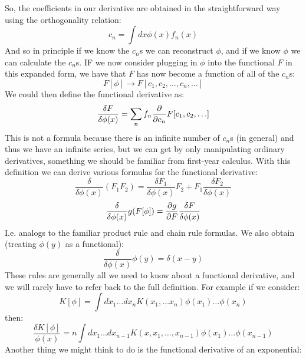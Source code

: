So, the coefficients in our derivative are obtained in the straightforward way using the orthogonality relation:
\begin{equation}
    c_n = \int dx \phi(x) f_n(x)
\end{equation}
And so in principle if we know the $c_n$s we can reconstruct $\phi$, and if we know $\phi$ we can calculate the $c_n$s. IF we now consider plugging in $\phi$ into the functional $F$ in this expanded form, we have that $F$ has now become a function of all of the $c_n$s:
\begin{equation}
    F[\phi] \to F[c_1, c_2, \ldots, c_n, \ldots]
\end{equation}
We could then define the functional derivative as:
\begin{equation}
    \frac{\delta F}{\delta \phi(x)} = \sum_n f_n \dpd{}{c_n}F[c_1, c_2, \ldots]
\end{equation}
This is not a formula because there is an infinite number of $c_n$s (in general) and thus we have an infinite series, but we can get by only manipulating ordinary derivatives, something we should be familiar from first-year calculus. With this definition we can derive various formulas for the functional derivative:
\begin{equation}
    \frac{\delta}{\delta \phi(x)}(F_1F_2) = \frac{\delta F_1}{\delta \phi(x)}F_2 + F_1\frac{\delta F_2}{\delta\phi(x)}
\end{equation}
\begin{equation}
    \frac{\delta}{\delta \phi(x)}g(F[\phi]) = \dpd{g}{F}\frac{\delta F}{\delta \phi (x)}
\end{equation}
I.e. analogs to the familiar product rule and chain rule formulas. We also obtain (treating $\phi(y)$ as a functional):
\begin{equation}
    \frac{\delta}{\delta \phi(x)}\phi(y) = \delta(x - y)
\end{equation}
These rules are generally all we need to know about a functional derivative, and we will rarely have to refer back to the full definition. For example if we consider:
\begin{equation}
    K[\phi] = \int dx_1 \ldots dx_n K(x_1, \ldots x_n)\phi(x_1) \ldots \phi(x_n)
\end{equation}
then:
\begin{equation}
    \frac{\delta K[\phi]}{\phi(x)} = n \int dx_1 \ldots dx_{n-1}K(x, x_1, \ldots, x_{n-1})\phi(x_1) \ldots \phi(x_{n-1})
\end{equation}
Another thing we might think to do is the functional derivative of an exponential:
